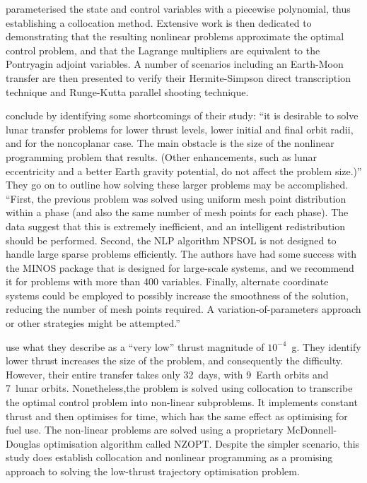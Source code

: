\textcite{Enright1992} parameterised the state and control variables with a piecewise polynomial, thus establishing a collocation method. Extensive work is then dedicated to demonstrating that the resulting nonlinear problems approximate the optimal control problem, and that the Lagrange multipliers are equivalent to the Pontryagin adjoint variables. A number of scenarios including an Earth-Moon transfer are then presented to verify their Hermite-Simpson direct transcription technique and Runge-Kutta parallel shooting technique. 

\citeauthor{Enright1992} conclude by identifying some shortcomings of their study: \enquote{it is desirable to solve lunar transfer problems for lower thrust levels, lower initial and final orbit radii, and for the noncoplanar case. The main obstacle is the size of the nonlinear programming problem that results. (Other enhancements, such as lunar eccentricity and a better Earth gravity potential, do not affect the problem size.)}
They go on to outline how solving these larger problems may be accomplished. \enquote{First, the previous problem was solved using uniform mesh point distribution within a phase (and also the same number of mesh points for each phase). The data suggest that this is extremely inefficient, and an intelligent redistribution should be performed. Second, the NLP algorithm NPSOL is not designed to handle large sparse problems efficiently. The authors have had some success with the MINOS package that is designed for large-scale systems, and we recommend it for problems with more than 400 variables. Finally, alternate coordinate systems could be employed to possibly increase the smoothness of the solution, reducing the number of mesh points required. A variation-of-parameters approach or other strategies might be attempted.}

\textcite{Herman1998} use what they describe as a \enquote{very low} thrust magnitude of $10^{-4}$~g. They identify lower thrust increases the size of the problem, and consequently the difficulty. However, their entire transfer takes only 32~days, with 9~Earth orbits and 7~lunar orbits. Nonetheless,the problem is solved using collocation to transcribe the optimal control problem into non-linear subproblems. It implements constant thrust and then optimises for time, which has the same effect as optimising for fuel use. The non-linear problems are solved using a proprietary McDonnell-Douglas optimisation algorithm called NZOPT. Despite the simpler scenario, this study does establish collocation and nonlinear programming as a promising approach to solving the low-thrust trajectory optimisation problem.

